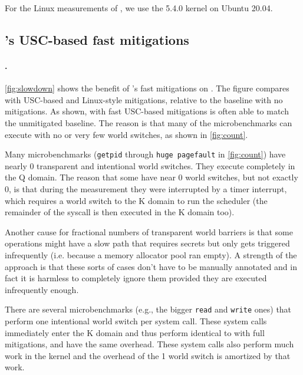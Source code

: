 For the Linux measurements of \bench, we use the 5.4.0 kernel on Ubuntu 20.04.


\subsection{\sys's USC-based fast mitigations}
\label{ss:faster}

\paragraph{\bench.}

\autoref{fig:slowdown} shows the benefit of \sys's fast mitigations on
\bench.  The figure compares \sys with USC-based and Linux-style mitigations,
relative to the baseline with no mitigations.
As shown, \sys with fast USC-based mitigations is often able to
match the unmitigated baseline.  The reason is that many of the microbenchmarks can
execute with no or very few world switches, as shown in
\autoref{fig:count}.

Many microbenchmarks (\texttt{getpid} through \texttt{huge pagefault}
in \autoref{fig:count}) have nearly 0 transparent and intentional
world switches. They execute completely in the Q domain. The
reason that some have near 0 world switches, but not exactly 0, is
that during the measurement they were interrupted by a timer
interrupt, which requires a world switch to the K domain to run the
scheduler (the remainder of the syscall is then executed in the K
domain too).

Another cause for fractional numbers of transparent world
barriers is that some operations might have a slow path that requires
secrets but only gets triggered infrequently (i.e. because a memory
allocator pool ran empty). A strength of the \sys approach is that these
sorts of cases don't have to be manually annotated and in fact it is
harmless to completely ignore them provided they are executed infrequently
enough.

There are several microbenchmarks (e.g., the bigger \texttt{read} and
\texttt{write} ones) that perform one intentional world switch per
system call.  These system calls immediately enter the K domain and
thus perform identical to \sys with full mitigations, and have the
same overhead.  These system calls also perform much work in the kernel and
the overhead of the 1 world switch is amortized by that work.

